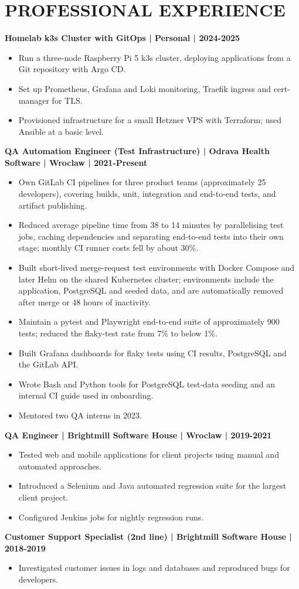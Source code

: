 \documentclass[11pt,a4paper]{article}
\begin{document}
\section*{PROFESSIONAL EXPERIENCE}
\textbf{Homelab k3s Cluster with GitOps | Personal | 2024-2025}
\begin{itemize}
\item Run a three-node Raspberry Pi 5 k3s cluster, deploying applications from a Git repository with Argo CD.
\item Set up Prometheus, Grafana and Loki monitoring, Traefik ingress and cert-manager for TLS.
\item Provisioned infrastructure for a small Hetzner VPS with Terraform; used Ansible at a basic level.
\end{itemize}
\textbf{QA Automation Engineer (Test Infrastructure) | Odrava Health Software | Wroclaw | 2021-Present}
\begin{itemize}
\item Own GitLab CI pipelines for three product teams (approximately 25 developers), covering builds, unit, integration and end-to-end tests, and artifact publishing.
\item Reduced average pipeline time from 38 to 14 minutes by parallelising test jobs, caching dependencies and separating end-to-end tests into their own stage; monthly CI runner costs fell by about 30\%.
\item Built short-lived merge-request test environments with Docker Compose and later Helm on the shared Kubernetes cluster; environments include the application, PostgreSQL and seeded data, and are automatically removed after merge or 48 hours of inactivity.
\item Maintain a pytest and Playwright end-to-end suite of approximately 900 tests; reduced the flaky-test rate from 7\% to below 1\%.
\item Built Grafana dashboards for flaky tests using CI results, PostgreSQL and the GitLab API.
\item Wrote Bash and Python tools for PostgreSQL test-data seeding and an internal CI guide used in onboarding.
\item Mentored two QA interns in 2023.
\end{itemize}
\textbf{QA Engineer | Brightmill Software House | Wroclaw | 2019-2021}
\begin{itemize}
\item Tested web and mobile applications for client projects using manual and automated approaches.
\item Introduced a Selenium and Java automated regression suite for the largest client project.
\item Configured Jenkins jobs for nightly regression runs.
\end{itemize}
\textbf{Customer Support Specialist (2nd line) | Brightmill Software House | 2018-2019}
\begin{itemize}
\item Investigated customer issues in logs and databases and reproduced bugs for developers.
\end{itemize}
\end{document}
